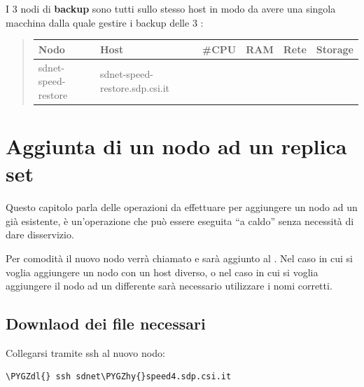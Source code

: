 \documentclass[a4paper,10pt,english]{sphinxmanual}
\def\PYGZdl{\char`\$}
\def\PYGZhy{\char`\-}
\begin{document}
I 3 nodi di \textbf{backup} sono tutti sullo stesso host  in modo da avere
una singola macchina dalla quale gestire i backup delle 3 {\hyperref[cluster_architecture/architecture:shard]{\emph{}}}:
\begin{quote}

\begin{tabulary}{\linewidth}{|L|L|L|L|L|L|}
\hline
\textsf{\relax 
\textbf{Nodo}
} & \textsf{\relax 
\textbf{Host}
} & \textsf{\relax 
\textbf{\#CPU}
} & \textsf{\relax 
\textbf{RAM}
} & \textsf{\relax 
\textbf{Rete}
} & \textsf{\relax 
\textbf{Storage}
}\\
\hline
sdnet-speed-restore
 & 
sdnet-speed-restore.sdp.csi.it
 &  &  &  & \\
\hline\end{tabulary}

\end{quote}


\chapter{Aggiunta di un nodo ad un replica set}
\label{cluster_architecture/add_replica:aggiunta-di-un-nodo-ad-un-replica-set}\label{cluster_architecture/add_replica::doc}\label{cluster_architecture/add_replica:add-replica}
Questo capitolo parla delle operazioni da effettuare per aggiungere un nodo ad un
{\hyperref[cluster_architecture/architecture:replica-set]{\emph{}}} già esistente, è un'operazione che può essere eseguita ``a caldo'' senza
necessità di dare disservizio.

Per comodità il nuovo nodo verrà chiamato  e sarà aggiunto al
{\hyperref[cluster_architecture/architecture:replica-set]{\emph{}}} .
Nel caso in cui si voglia aggiungere un nodo con un host diverso, o nel caso in cui si voglia
aggiungere il nodo ad un differente {\hyperref[cluster_architecture/architecture:replica-set]{\emph{}}} sarà necessario utilizzare i nomi corretti.


\section{Downlaod dei file necessari}
\label{cluster_architecture/add_replica:downlaod-dei-file-necessari}
Collegarsi tramite ssh al nuovo nodo:

\begin{Verbatim}[commandchars=\\\{\}]
\PYGZdl{} ssh sdnet\PYGZhy{}speed4.sdp.csi.it
\end{Verbatim}
\end{document}
